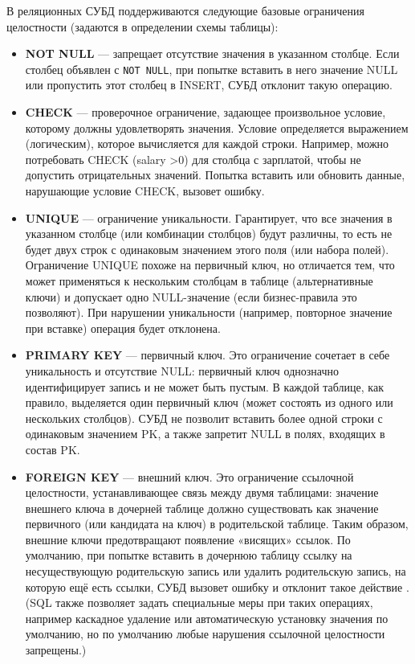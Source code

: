  В реляционных СУБД поддерживаются следующие базовые ограничения целостности (задаются в определении схемы таблицы): 
 \begin{itemize}
    \item \textbf{NOT NULL} — запрещает отсутствие значения в указанном столбце. Если столбец объявлен с \texttt{NOT NULL}, при попытке вставить в него значение NULL или пропустить этот столбец в INSERT, СУБД отклонит такую операцию.
    \item \textbf{CHECK} — проверочное ограничение, задающее произвольное условие, которому должны удовлетворять значения. Условие определяется выражением (логическим), которое вычисляется для каждой строки. Например, можно потребовать CHECK (salary \textgreater 0) для столбца с зарплатой, чтобы не допустить отрицательных значений. Попытка вставить или обновить данные, нарушающие условие CHECK, вызовет ошибку.
    \item \textbf{UNIQUE} — ограничение уникальности. Гарантирует, что все значения в указанном столбце (или комбинации столбцов) будут различны, то есть не будет двух строк с одинаковым значением этого поля (или набора полей). Ограничение UNIQUE похоже на первичный ключ, но отличается тем, что может применяться к нескольким столбцам в таблице (альтернативные ключи) и допускает одно NULL-значение (если бизнес-правила это позволяют). При нарушении уникальности (например, повторное значение при вставке) операция будет отклонена.
    \item \textbf{PRIMARY KEY} — первичный ключ. Это ограничение сочетает в себе уникальность и отсутствие NULL: первичный ключ однозначно идентифицирует запись и не может быть пустым. В каждой таблице, как правило, выделяется один первичный ключ (может состоять из одного или нескольких столбцов). СУБД не позволит вставить более одной строки с одинаковым значением PK, а также запретит NULL в полях, входящих в состав PK.
    \item \textbf{FOREIGN KEY} — внешний ключ. Это ограничение ссылочной целостности, устанавливающее связь между двумя таблицами: значение внешнего ключа в дочерней таблице должно существовать как значение первичного (или кандидата на ключ) в родительской таблице. Таким образом, внешние ключи предотвращают появление «висящих» ссылок. По умолчанию, при попытке вставить в дочернюю таблицу ссылку на несуществующую родительскую запись или удалить родительскую запись, на которую ещё есть ссылки, СУБД вызовет ошибку и отклонит такое действие \autocite{Silberschatz}. (SQL также позволяет задать специальные меры при таких операциях, например каскадное удаление или автоматическую установку значения по умолчанию, но по умолчанию любые нарушения ссылочной целостности запрещены.)
 \end{itemize} 

